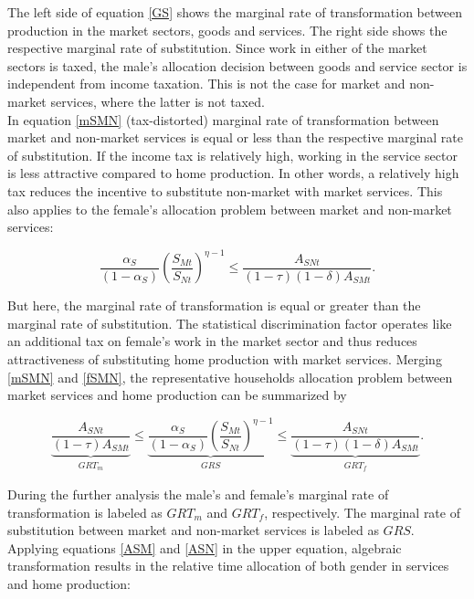 \documentclass[a4paper,12pt]{article}
\begin{document}
The left side of equation \eqref{GS} shows the marginal rate of transformation between production in the market sectors, goods and services. The right side shows the respective marginal rate of substitution. Since work in either of the market sectors is taxed, the male's allocation decision between goods and service sector is independent from income taxation. This is not the case for market and non-market services, where the latter is not taxed. \\
In equation \eqref{mSMN} (tax-distorted) marginal rate of transformation between market and non-market services is equal or less than the respective marginal rate of substitution. If the income tax is relatively high, working in the service sector is less attractive compared to home production. In other words, a relatively high tax reduces the incentive to substitute non-market with market services. This also applies to the female's allocation problem between market and non-market services:

\begin{equation} \label{fSMN}
 \frac{\alpha_S}{(1-\alpha_S)} {\left(\frac{S_{Mt}}{S_{Nt}}\right)}^{\eta -1} \leq \frac{A_{SNt}}{(1-\tau)(1- \delta)A_{SMt}}.
\end{equation} 

But here, the marginal rate of transformation is equal or greater than the marginal rate of substitution. The statistical discrimination factor operates like an additional tax on female's work in the market sector and thus reduces attractiveness of substituting home production with market services. Merging \eqref{mSMN} and \eqref{fSMN}, the representative households allocation problem between market services and home production can be summarized by 

\begin{equation} 
\underbrace{\frac{A_{SNt}}{(1-\tau)A_{SMt}}}_{\substack{GRT_m}} \leq \underbrace{\frac{\alpha_S}{(1-\alpha_S)} {\left(\frac{S_{Mt}}{S_{Nt}}\right)}^{\eta -1}}_{\substack{GRS}} \leq \underbrace{\frac{A_{SNt}}{(1-\tau)(1- \delta)A_{SMt}}}_{\substack{GRT_f}}.
\label{GRT}
\end{equation} 

During the further analysis the male's and female's marginal rate of transformation is labeled as $GRT_m$ and $GRT_f$, respectively. The marginal rate of substitution between market and non-market services is labeled as $GRS$. Applying equations \eqref{ASM} and \eqref{ASN} in the upper equation, algebraic transformation results in the relative time allocation of both gender in services and home production:
\end{document}
